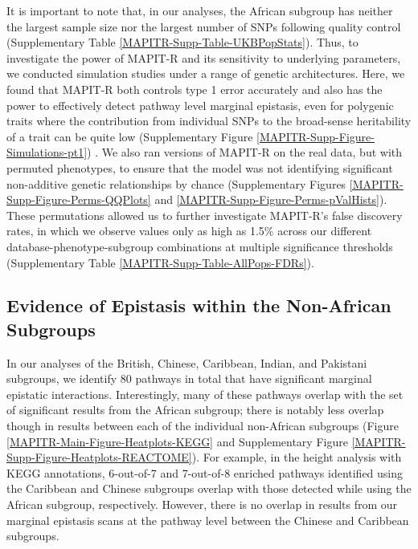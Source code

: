 \documentclass[10pt]{article}
\begin{document}
It is important to note that, in our analyses, the African subgroup has neither the largest sample size nor the largest number of SNPs following quality control (Supplementary Table \ref{MAPITR-Supp-Table-UKBPopStats}). Thus, to investigate the power of MAPIT-R and its sensitivity to underlying parameters, we conducted simulation studies under a range of genetic architectures. Here, we found that MAPIT-R both controls type 1 error accurately and also has the power to effectively detect pathway level marginal epistasis, even for polygenic traits where the contribution from individual SNPs to the broad-sense heritability of a trait can be quite low (Supplementary Figure \ref{MAPITR-Supp-Figure-Simulations-pt1}) \cite{Crawford2017a}. We also ran versions of MAPIT-R on the real data, but with permuted phenotypes, to ensure that the model was not identifying significant non-additive genetic relationships by chance (Supplementary Figures \ref{MAPITR-Supp-Figure-Perms-QQPlots} and \ref{MAPITR-Supp-Figure-Perms-pValHists}). These permutations allowed us to further investigate MAPIT-R's false discovery rates, in which we observe values only as high as 1.5\% across our different database-phenotype-subgroup combinations at multiple significance thresholds (Supplementary Table \ref{MAPITR-Supp-Table-AllPops-FDRs}).

\subsection*{Evidence of Epistasis within the Non-African Subgroups}

In our analyses of the British, Chinese, Caribbean, Indian, and Pakistani subgroups, we identify 80 pathways in total that have significant marginal epistatic interactions. Interestingly, many of these pathways overlap with the set of significant results from the African subgroup; there is notably less overlap though in results between each of the individual non-African subgroups (Figure \ref{MAPITR-Main-Figure-Heatplots-KEGG} and Supplementary Figure \ref{MAPITR-Supp-Figure-Heatplots-REACTOME}). For example, in the height analysis with KEGG annotations, 6-out-of-7 and 7-out-of-8 enriched pathways identified using the Caribbean and Chinese subgroups overlap with those detected while using the African subgroup, respectively. However, there is no overlap in results from our marginal epistasis scans at the pathway level between the Chinese and Caribbean subgroups.
\end{document}
